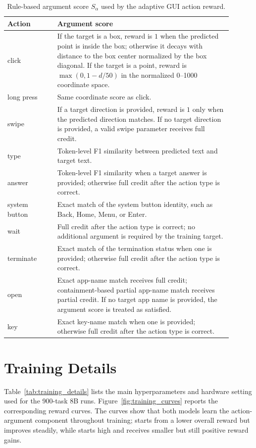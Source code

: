 \begin{table}[t]
\centering
\paperTable
\caption{Rule-based argument score $S_{\alpha}$ used by the adaptive GUI action reward.}
\label{tab:adaptive_gui_reward}
\begin{tabular}{p{0.20\linewidth} p{0.70\linewidth}}
\toprule
\textbf{Action} & \textbf{Argument score} \\
\midrule
click & If the target is a box, reward is $1$ when the predicted point is inside the box; otherwise it decays with distance to the box center normalized by the box diagonal. If the target is a point, reward is $\max(0,1-d/50)$ in the normalized 0--1000 coordinate space. \\
long press & Same coordinate score as click. \\
swipe & If a target direction is provided, reward is $1$ only when the predicted direction matches. If no target direction is provided, a valid swipe parameter receives full credit. \\
type & Token-level F1 similarity between predicted text and target text. \\
answer & Token-level F1 similarity when a target answer is provided; otherwise full credit after the action type is correct. \\
system button & Exact match of the system button identity, such as Back, Home, Menu, or Enter. \\
wait & Full credit after the action type is correct; no additional argument is required by the training target. \\
terminate & Exact match of the termination status when one is provided; otherwise full credit after the action type is correct. \\
open & Exact app-name match receives full credit; containment-based partial app-name match receives partial credit. If no target app name is provided, the argument score is treated as satisfied. \\
key & Exact key-name match when one is provided; otherwise full credit after the action type is correct. \\
\bottomrule
\end{tabular}
\end{table}

\section{Training Details}
\label{sec:appendix_training_details}

Table~\ref{tab:training_details} lists the main hyperparameters and hardware setting used for the 900-task 8B runs. Figure~\ref{fig:training_curves} reports the corresponding reward curves. The curves show that both models learn the action-argument component throughout training;  starts from a lower overall reward but improves steadily, while  starts high and receives smaller but still positive reward gains.

